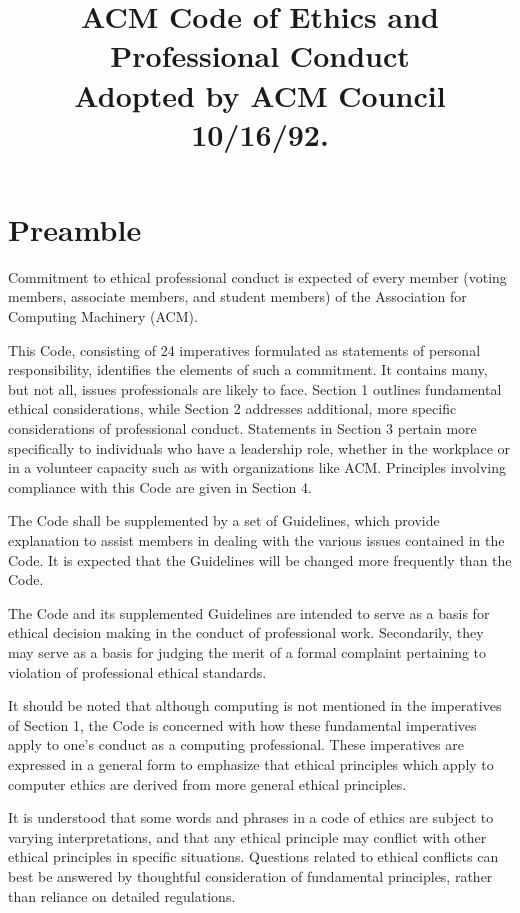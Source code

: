 \documentclass{article}
\title{ACM Code of Ethics and Professional Conduct \\ {\large Adopted by ACM
Council 10/16/92.}}
\author{}
\date{}
\begin{document}
\maketitle

\section*{Preamble}

Commitment to ethical professional conduct is expected of every member (voting
members, associate members, and student members) of the Association for
Computing Machinery (ACM).

This Code, consisting of 24 imperatives formulated as statements of personal
responsibility, identifies the elements of such a commitment. It contains many,
but not all, issues professionals are likely to face. Section 1 outlines
fundamental ethical considerations, while Section 2 addresses additional, more
specific considerations of professional conduct. Statements in Section 3
pertain more specifically to individuals who have a leadership role, whether in
the workplace or in a volunteer capacity such as with organizations like ACM\@.
Principles involving compliance with this Code are given in Section 4.

The Code shall be supplemented by a set of Guidelines, which provide
explanation to assist members in dealing with the various issues contained in
the Code. It is expected that the Guidelines will be changed more frequently
than the Code.

The Code and its supplemented Guidelines are intended to serve as a basis for
ethical decision making in the conduct of professional work. Secondarily, they
may serve as a basis for judging the merit of a formal complaint pertaining to
violation of professional ethical standards.

It should be noted that although computing is not mentioned in the imperatives
of Section 1, the Code is concerned with how these fundamental imperatives
apply to one's conduct as a computing professional. These imperatives are
expressed in a general form to emphasize that ethical principles which apply to
computer ethics are derived from more general ethical principles.

It is understood that some words and phrases in a code of ethics are subject to
varying interpretations, and that any ethical principle may conflict with other
ethical principles in specific situations. Questions related to ethical
conflicts can best be answered by thoughtful consideration of fundamental
principles, rather than reliance on detailed regulations.
\end{document}
